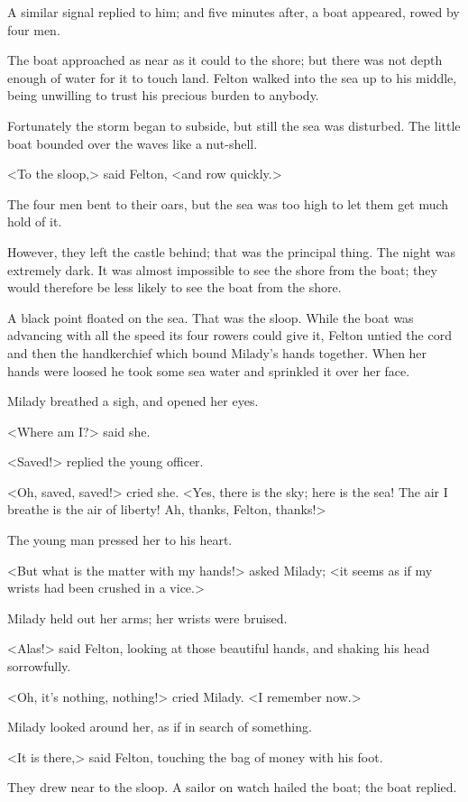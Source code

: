 A similar signal replied to him; and five minutes after, a boat appeared, rowed by four men. 

The boat approached as near as it could to the shore; but there was not depth enough of water for it to touch land. Felton walked into the sea up to his middle, being unwilling to trust his precious burden to anybody. 

Fortunately the storm began to subside, but still the sea was disturbed. The little boat bounded over the waves like a nut-shell. 

<To the sloop,> said Felton, <and row quickly.> 

The four men bent to their oars, but the sea was too high to let them get much hold of it. 

However, they left the castle behind; that was the principal thing. The night was extremely dark. It was almost impossible to see the shore from the boat; they would therefore be less likely to see the boat from the shore. 

A black point floated on the sea. That was the sloop. While the boat was advancing with all the speed its four rowers could give it, Felton untied the cord and then the handkerchief which bound Milady's hands together. When her hands were loosed he took some sea water and sprinkled it over her face. 

Milady breathed a sigh, and opened her eyes. 

<Where am I?> said she. 

<Saved!> replied the young officer. 

<Oh, saved, saved!> cried she. <Yes, there is the sky; here is the sea! The air I breathe is the air of liberty! Ah, thanks, Felton, thanks!> 

The young man pressed her to his heart. 

<But what is the matter with my hands!> asked Milady; <it seems as if my wrists had been crushed in a vice.> 

Milady held out her arms; her wrists were bruised. 

<Alas!> said Felton, looking at those beautiful hands, and shaking his head sorrowfully. 

<Oh, it's nothing, nothing!> cried Milady. <I remember now.> 

Milady looked around her, as if in search of something. 

<It is there,> said Felton, touching the bag of money with his foot. 

They drew near to the sloop. A sailor on watch hailed the boat; the boat replied. 

